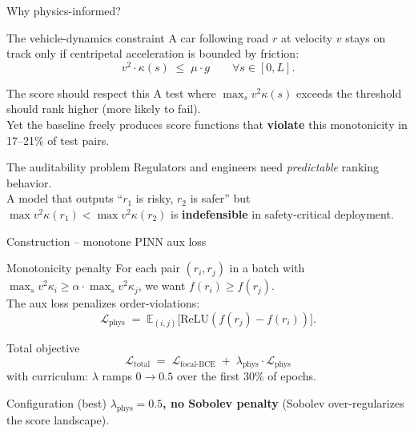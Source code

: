 \documentclass[aspectratio=169,10pt]{beamer}
\begin{document}
\begin{frame}{Why physics-informed?}
\begin{block}{The vehicle-dynamics constraint}
A car following road $r$ at velocity $v$ stays on track only if centripetal acceleration is bounded by friction:
\[
  v^2 \cdot \kappa(s) \;\le\; \mu \cdot g \qquad \forall s \in [0, L].
\]
\end{block}

\begin{exampleblock}{The score should respect this}
\footnotesize
A test where $\max_s v^2 \kappa(s)$ exceeds the threshold should rank higher (more likely to fail).\\[3pt]
Yet the baseline freely produces score functions that \textbf{violate} this monotonicity in 17--21\% of test pairs.
\end{exampleblock}

\begin{alertblock}{The auditability problem}
\footnotesize
Regulators and engineers need \emph{predictable} ranking behavior.\\
A model that outputs ``$r_1$ is risky, $r_2$ is safer'' but $\max v^2 \kappa(r_1) < \max v^2 \kappa(r_2)$ is \textbf{indefensible} in safety-critical deployment.
\end{alertblock}
\end{frame}

\begin{frame}{Construction -- monotone PINN aux loss}
\begin{block}{Monotonicity penalty}
\footnotesize
For each pair $(r_i, r_j)$ in a batch with $\max_s v^2 \kappa_i \ge \alpha \cdot \max_s v^2 \kappa_j$, we want $f(r_i) \ge f(r_j)$.\\
The aux loss penalizes order-violations:
\[
  \mathcal{L}_{\text{phys}} \;=\; \mathbb{E}_{(i,j)} \big[ \mathrm{ReLU}(f(r_j) - f(r_i)) \big].
\]
\end{block}

\begin{block}{Total objective}
\centering
\footnotesize
\[
  \mathcal{L}_{\text{total}} \;=\; \mathcal{L}_{\text{focal-BCE}} \;+\; \lambda_{\text{phys}} \cdot \mathcal{L}_{\text{phys}}
\]
with curriculum: $\lambda$ ramps $0 \to 0.5$ over the first 30\% of epochs.
\end{block}

\begin{exampleblock}{Configuration (best)}
\footnotesize
\textbf{$\lambda_{\text{phys}} = 0.5$, no Sobolev penalty} (Sobolev over-regularizes the score landscape).
\end{exampleblock}
\end{frame}
\end{document}
